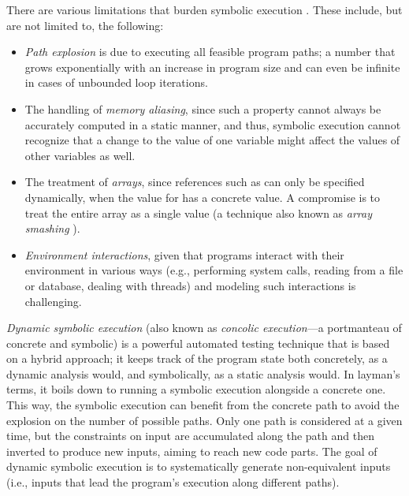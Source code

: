 There are various limitations that burden symbolic execution \cite{sas:2011:Ma,issta:2010:Staats,pldi:2012:Kuznetsov,article:1991:DeMilli}. These include, but are not limited to, the following:
\begin{itemize}
\item \emph{Path explosion} is due to executing all feasible program paths; a number that grows exponentially with an increase in program size and can even be infinite in cases of unbounded loop iterations.

\item The handling of \emph{memory aliasing}, since such a property cannot always be accurately computed in a static manner, and thus, symbolic execution cannot recognize that a change to the value of one variable might affect the values of other variables as well.

\item The treatment of \emph{arrays}, since references such as  can only be specified dynamically, when the value for  has a concrete value. A compromise is to treat the entire array as a single value (a technique also known as \emph{array smashing} \cite{article:2002:Blanchet}).

\item \emph{Environment interactions}, given that programs interact with their environment in various ways (e.g., performing system calls, reading from a file or database, dealing with threads) and modeling such interactions is challenging.
\end{itemize}

\emph{Dynamic symbolic execution} \cite{pldi:2005:Godefroid,esec:2005:Koushik,cav:2006:Koushik,article:2008:Cadar,edcc:2005:Williams} (also known as \emph{concolic execution}---a portmanteau of concrete and symbolic) is a powerful automated testing technique that is based on a hybrid approach; it keeps track of the program state both concretely, as a dynamic analysis would, and symbolically, as a static analysis would. In layman's terms, it boils down to running a symbolic execution alongside a concrete one. This way, the symbolic execution can benefit from the concrete path to avoid the explosion on the number of possible paths. Only one path is considered at a given time, but the constraints on input are accumulated along the path and then inverted to produce new inputs, aiming to reach new code parts. The goal of dynamic symbolic execution is to systematically generate non-equivalent inputs (i.e., inputs that lead the program’s execution along different paths).

